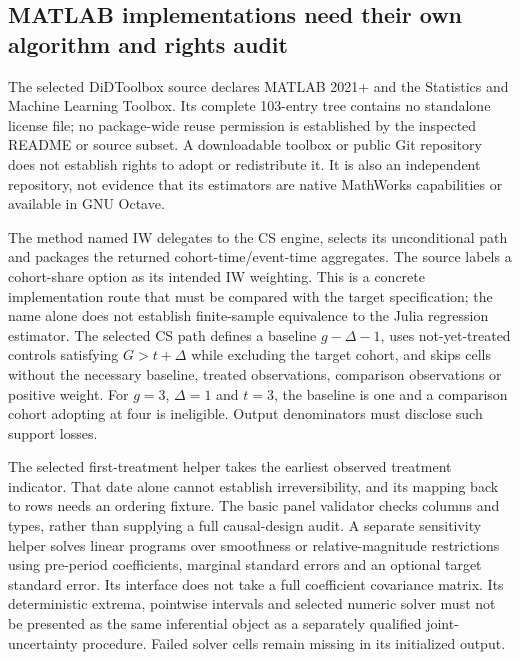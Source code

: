 \subsection{MATLAB implementations need their own algorithm and rights audit}
The selected DiDToolbox source declares MATLAB 2021+ and the Statistics and
Machine Learning Toolbox. Its complete 103-entry tree contains no standalone
license file; no package-wide reuse permission is established by the inspected
README or source subset. A downloadable toolbox or public Git repository
does not establish rights to adopt or redistribute it. It is also an
independent repository, not evidence that its estimators are native
MathWorks capabilities or available in GNU Octave.~\citep{exec25_panelother_matlab}

The method named IW delegates to the CS engine, selects its unconditional
path and packages the returned cohort-time/event-time aggregates. The source
labels a cohort-share option as its intended IW weighting. This is a concrete
implementation route that must be compared with the target specification;
the name alone does not establish finite-sample equivalence to the Julia
regression estimator. The selected CS path defines a baseline
$g-\Delta-1$, uses not-yet-treated controls satisfying $G>t+\Delta$
while excluding the target cohort, and skips cells without the necessary
baseline, treated observations, comparison observations or positive weight.
For $g=3$, $\Delta=1$ and $t=3$, the baseline is one and a comparison cohort
adopting at four is ineligible. Output denominators must disclose such
support losses.~\citep{exec25_panelother_matlab,exec25_panelother_choice}

The selected first-treatment helper takes the earliest observed treatment
indicator. That date alone cannot establish irreversibility, and its mapping
back to rows needs an ordering fixture. The basic panel validator checks
columns and types, rather than supplying a full causal-design audit. A
separate sensitivity helper solves linear programs over smoothness or
relative-magnitude restrictions using pre-period coefficients, marginal
standard errors and an optional target standard error. Its interface does
not take a full coefficient covariance matrix. Its deterministic extrema,
pointwise intervals and selected numeric solver must not be presented as
the same inferential object as a separately qualified joint-uncertainty
procedure. Failed solver cells remain missing in its initialized output.
\citep{exec25_panelother_matlab}

